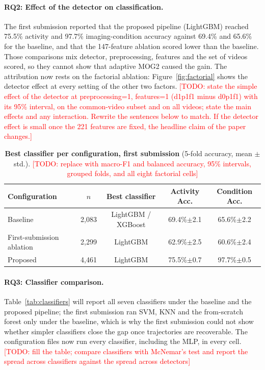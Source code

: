 \documentclass[runningheads]{llncs}
\newcommand{\todo}[1]{\textcolor{red}{[TODO: #1]}}
\begin{document}
\paragraph{RQ2: Effect of the detector on classification.}

The first submission reported that the proposed pipeline (LightGBM) reached 75.5\% activity and 97.7\%
imaging-condition accuracy against 69.4\% and 65.6\% for the baseline, and that the 147-feature
ablation scored lower than the baseline. Those comparisons mix detector, preprocessing, features and
the set of videos scored, so they cannot show that adaptive MOG2 caused the gain. The attribution now rests on
the factorial ablation: Figure~\ref{fig:factorial} shows the detector effect at every setting of the other
two factors. \todo{state the simple effect of the detector at preprocessing=1, features=1 (d1p1f1 minus d0p1f1) with its 95\% interval, on the common-video subset and on all videos; state the main effects and any interaction. Rewrite the sentences below to match. If the detector effect is small once the 221 features are fixed, the headline claim of the paper changes.}

\begin{table}[htbp]
\centering
\caption{\textbf{Best classifier per configuration, first submission} (5-fold accuracy, mean $\pm$ std.).
\todo{replace with macro-F1 and balanced accuracy, 95\% intervals, grouped folds, and all eight factorial cells}}
\label{tab:activity}
\fontsize{8}{9.6}\selectfont
\begin{tabular}{lcccc}
\toprule
\textbf{Configuration} & \textbf{$n$} & \textbf{Best classifier} & \textbf{Activity Acc.} & \textbf{Condition Acc.} \\
\midrule
Baseline & 2,083 & LightGBM / XGBoost & 69.4\%$\pm$2.1 & 65.6\%$\pm$2.2 \\
First-submission ablation & 2,299 & LightGBM & 62.9\%$\pm$2.5 & 60.6\%$\pm$2.4 \\
Proposed & 4,461 & LightGBM & 75.5\%$\pm$0.7 & 97.7\%$\pm$0.5 \\
\bottomrule
\end{tabular}
\end{table}

\paragraph{RQ3: Classifier comparison.}

Table~\ref{tab:classifiers} will report all seven classifiers under the baseline and the proposed
pipeline; the first submission ran SVM, KNN and the from-scratch forest only under the baseline, which is
why the first submission could not show whether simpler classifiers close the gap once trajectories are
recoverable. The configuration files now run every classifier, including the MLP, in every cell.
\todo{fill the table; compare classifiers with McNemar's test and report the spread across classifiers against the spread across detectors}
\end{document}
